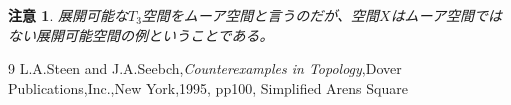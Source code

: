 \documentclass[leqno]{jsarticle}
\newtheorem*{cau}{注意}
\begin{document}
\begin{cau}
展開可能な$T_3$空間をムーア空間と言うのだが、空間$X$はムーア空間ではない展開可能空間の例ということである。
\end{cau}

	
\begin{thebibliography}{9}
L.A.Steen and J.A.Seebch,{\it Counterexamples in Topology},Dover Publications,Inc.,New York,1995, pp100, Simplified Arens Square
\end{thebibliography}




			
\end{document}

